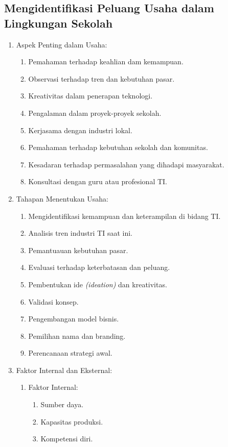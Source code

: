\subsection{Mengidentifikasi Peluang Usaha dalam Lingkungan Sekolah}
\begin{enumerate}
\item Aspek Penting dalam Usaha:
  \begin{enumerate}
  \item Pemahaman terhadap keahlian dam kemampuan.
  \item Observasi terhadap tren dan kebutuhan pasar.
  \item Kreativitas dalam penerapan teknologi.
  \item Pengalaman dalam proyek-proyek sekolah.
  \item Kerjasama dengan industri lokal.
  \item Pemahaman terhadap kebutuhan sekolah dan komunitas.
  \item Kesadaran terhadap permasalahan yang dihadapi masyarakat.
  \item Konsultasi dengan guru atau profesional TI.
  \end{enumerate}
\item Tahapan Menentukan Usaha:
  \begin{enumerate}
  \item Mengidentifikasi kemampuan dan keterampilan di bidang TI.
  \item Analisis tren industri TI saat ini.
  \item Pemantuauan kebutuhan pasar.
  \item Evaluasi terhadap keterbatasan dan peluang.
  \item Pembentukan ide \textit{(ideation)} dan kreativitas.
  \item Validasi konsep.
  \item Pengembangan model bisnis.
  \item Pemilihan nama dan branding.
  \item Perencanaan strategi awal.
  \end{enumerate}
\item Faktor Internal dan Eksternal:
  \begin{enumerate}
  \item Faktor Internal:
    \begin{enumerate}
    \item Sumber daya.
    \item Kapasitas produksi.
    \item Kompetensi diri.

\end{enumerate}
\end{enumerate}
\end{enumerate}
